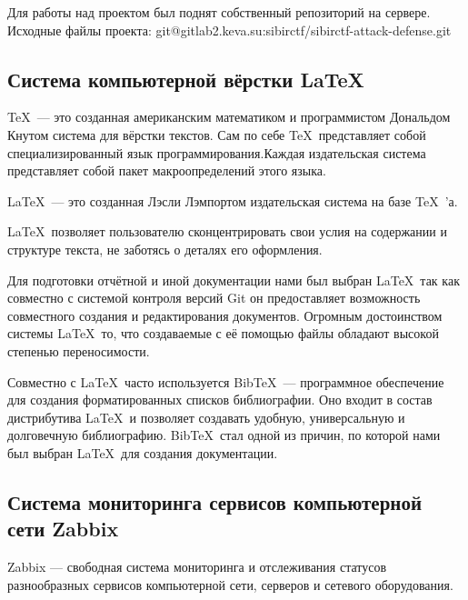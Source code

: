 Для работы над проектом был поднят собственный репозиторий на сервере. Исходные файлы проекта: 
git@gitlab2.keva.su:sibirctf/sibirctf-attack-defense.git\\

\subsection{Система компьютерной вёрстки \LaTeX}

\TeX\ --- это созданная американским математиком и программистом Дональдом Кнутом система для вёрстки текстов. Сам по себе \TeX\ представляет собой специализированный язык программирования.Каждая издательская система представляет собой пакет макроопределений этого языка.\par

\LaTeX\ --- это созданная Лэсли Лэмпортом издательская система на базе \TeX\ 'а.\par 
\LaTeX\ позволяет пользователю сконцентрировать свои услия на содержании и структуре текста, не заботясь о деталях его оформления.\par

Для подготовки отчётной и иной документации нами был выбран \LaTeX\, так как совместно с системой контроля версий Git он предоставляет возможность совместного создания и редактирования документов. Огромным достоинством системы \LaTeX\ то, что создаваемые с её помощью файлы обладают высокой степенью переносимости.\par

Совместно с \LaTeX\ часто используется Bib\TeX\ --- программное обеспечение для создания форматированных списков библиографии. Оно входит в состав дистрибутива \LaTeX\ и позволяет создавать удобную, универсальную и долговечную библиографию. Bib\TeX\ стал одной из причин, по которой нами был выбран \LaTeX\ для создания документации.\\

\subsection{Система мониторинга сервисов компьютерной сети Zabbix}

Zabbix ---  свободная система мониторинга и отслеживания статусов разнообразных сервисов компьютерной сети, серверов и сетевого оборудования. \par

